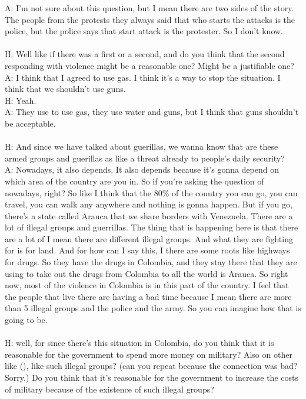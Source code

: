 \documentclass{phyasgn}\usepackage{nag}
\begin{document}
A: I'm not sure about this question, but I mean there are two sides of the story. The people from the protests they always said that who starts the attacks is the police, but the police says that start attack is the protester. So I don't know.\\
\\
H: Well like if there was a first or a second, and do you think that the second responding with violence might be a reasonable one? Might be a justifiable one?\\
A: I think that I agreed to use gas. I think it's a way to stop the situation. I think that we shouldn't use guns.\\
H: Yeah.\\
A: They use to use gas, they use water and guns, but I think that guns shouldn't be acceptable.\\
\\
H: And since we have talked about guerillas, we wanna know that are these armed groups and guerillas as like a threat already to people's daily security?\\
A: Nowadays, it also depends. It also depends because it's gonna depend on which area of the country are you in. So if you're asking the question of nowadays, right? So like I think that the 80\% of the country you can go, you can travel, you can walk any anywhere and nothing is gonna happen. But if you go, there's a state called Arauca that we share borders with Venezuela. There are a lot of illegal groups and guerrillas. The thing that is happening here is that there are a lot of I mean there are different illegal groups. And what they are fighting for is for land. And for how can I say this, I there are some roots like highways for drugs. So they have the drugs in Colombia, and they stay there that they are using to take out the drugs from Colombia to all the world is Arauca. So right now, most of the violence in Colombia is in this part of the country. I feel that the people that live there are having a bad time because I mean there are more than 5 illegal groups and the police and the army. So you can imagine how that is going to be.\\
\\
H: well, for since there's this situation in Colombia, do you think that it is reasonable for the government to spend more money on military? Also on other like (), like such illegal groups? 
(can you repeat because the connection was bad? Sorry.)
Do you think that it's reasonable for the government to increase the costs of military because of the existence of such illegal groups?\\
\end{document}
